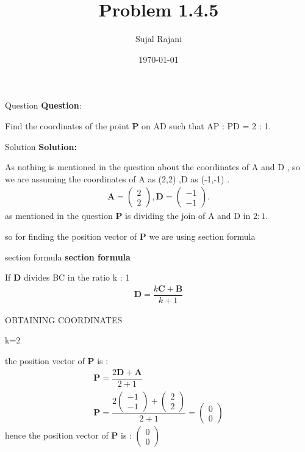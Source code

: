 \documentclass{beamer}
\title{Problem 1.4.5}
\author{Sujal Rajani}
\date{\today}
\let\vec\mathbf
\newcommand{\myvec}[1]{\ensuremath{\begin{pmatrix}#1\end{pmatrix}}}
\theoremstyle{remark}
\numberwithin{equation}{section}
\begin{document}
\begin{frame}
\titlepage
\end{frame}



\begin{frame}{Question}
\textbf{Question}:


\noindent Find the coordinates of the point $\vec{P}$ on AD such that AP : PD = 2 : 1.    
\end{frame}

\begin{frame}{Solution}
\textbf{Solution:} 

As nothing is mentioned in the question about the coordinates of A and D , so we are assuming the coordinates of A as (2,2) ,D as (-1,-1) .
\begin{align}
			\vec A = \myvec{2\\2},\vec D = \myvec{-1\\-1}.
\end{align}
as mentioned in the question $\vec{P}$ is dividing the join of A and D in $2:1$.

so for finding the position vector of $\vec{P}$ we are using section formula 
\end{frame} 

\begin{frame}{section formula }
    \textbf{section formula }

If $\vec{D}$ divides BC in the ratio k : 1
\begin{align*}
     \vec{D}=\dfrac{k\vec{C}+\vec{B}}{k+1}
\end{align*}

\end{frame}
\begin{frame}{OBTAINING COORDINATES}

\quad k=2

    the position vector of $\vec{P}$ is : 
\begin{align*}
     \vec{P}=\dfrac{2\vec{D}+\vec{A}}{2+1}
     \\
     \vec{P}=\dfrac{2\myvec{-1\\-1}+\myvec{2\\2}}{2+1}=\myvec{0\\0}
\end{align*}
hence the position vector of $\vec{P}$ is : $\myvec{0\\0}$
\end{frame}
\end{document}
